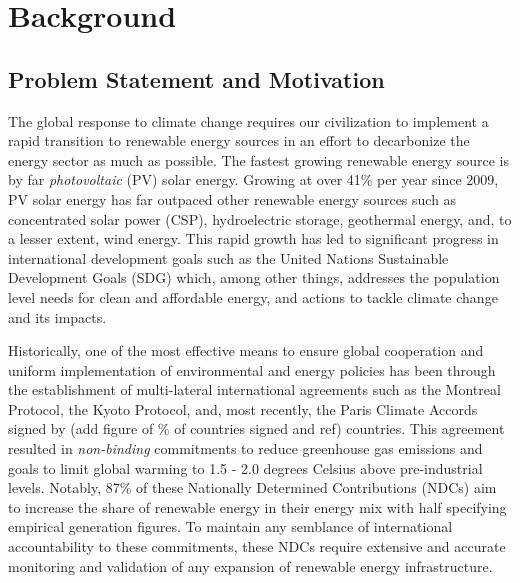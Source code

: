 \section{Background}

\begin{multicols}{2}
\subsection{Problem Statement and Motivation} 
The global response to climate change requires our civilization to implement a rapid transition to renewable energy sources in an effort to 
decarbonize the energy sector as much as possible. The fastest growing renewable energy source is by far \textit{photovoltaic} (PV) solar energy. Growing at over 41\% per year since 2009\cite{kruitwagen_global_inventory_pv_units_2021},
PV solar energy has far outpaced other renewable energy sources such as concentrated solar power (CSP), hydroelectric storage, geothermal energy, and, to a lesser extent, wind energy. 
This rapid growth has led to significant progress in international development goals such as the United Nations Sustainable Development Goals (SDG) which, among other things, 
addresses the population level needs for clean and affordable energy, and actions to tackle climate change and its impacts\cite{maxar_germany_pv_dataset}. 

Historically, one of the most effective means to ensure global cooperation and uniform implementation of environmental and energy policies has been through the establishment of multi-lateral international agreements such as the Montreal Protocol, the Kyoto Protocol, and, most recently, the Paris Climate Accords signed by (add figure of \% of countries signed and ref) countries. This agreement resulted in \textit{non-binding} commitments to reduce greenhouse gas emissions and goals to 
limit global warming to 1.5 - 2.0 degrees Celsius above pre-industrial levels. Notably, 87\% of these Nationally Determined Contributions (NDCs) aim to increase the share of renewable energy in their energy mix with half specifying empirical generation figures\cite{robinson_ms_planet_global_renewables_watch_2025}. To maintain any semblance of international accountability to these commitments, these NDCs require extensive and accurate monitoring and validation of any expansion of renewable energy infrastructure. 


\end{multicols}
